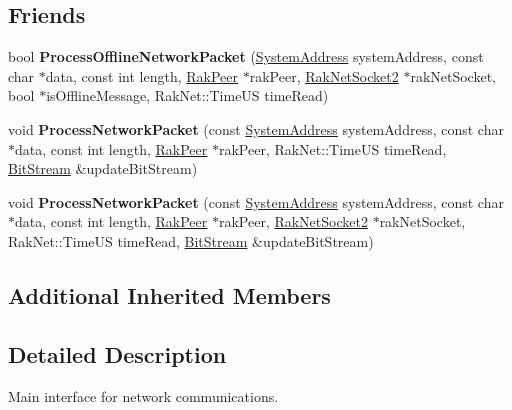 \subsection*{Friends}
\begin{DoxyCompactItemize}
\item 
\hypertarget{class_rak_net_1_1_rak_peer_a3e466ba5f51c005cfd11c2d51c850cfc}{bool {\bfseries Process\-Offline\-Network\-Packet} (\hyperlink{struct_rak_net_1_1_system_address}{System\-Address} system\-Address, const char $\ast$data, const int length, \hyperlink{class_rak_net_1_1_rak_peer}{Rak\-Peer} $\ast$rak\-Peer, \hyperlink{class_rak_net_1_1_rak_net_socket2}{Rak\-Net\-Socket2} $\ast$rak\-Net\-Socket, bool $\ast$is\-Offline\-Message, Rak\-Net\-::\-Time\-U\-S time\-Read)}\label{class_rak_net_1_1_rak_peer_a3e466ba5f51c005cfd11c2d51c850cfc}

\item 
\hypertarget{class_rak_net_1_1_rak_peer_a4fabf847d6bd9df927c3d901acf191de}{void {\bfseries Process\-Network\-Packet} (const \hyperlink{struct_rak_net_1_1_system_address}{System\-Address} system\-Address, const char $\ast$data, const int length, \hyperlink{class_rak_net_1_1_rak_peer}{Rak\-Peer} $\ast$rak\-Peer, Rak\-Net\-::\-Time\-U\-S time\-Read, \hyperlink{class_rak_net_1_1_bit_stream}{Bit\-Stream} \&update\-Bit\-Stream)}\label{class_rak_net_1_1_rak_peer_a4fabf847d6bd9df927c3d901acf191de}

\item 
\hypertarget{class_rak_net_1_1_rak_peer_a8ea495739778e3541a1f6347e72c09a7}{void {\bfseries Process\-Network\-Packet} (const \hyperlink{struct_rak_net_1_1_system_address}{System\-Address} system\-Address, const char $\ast$data, const int length, \hyperlink{class_rak_net_1_1_rak_peer}{Rak\-Peer} $\ast$rak\-Peer, \hyperlink{class_rak_net_1_1_rak_net_socket2}{Rak\-Net\-Socket2} $\ast$rak\-Net\-Socket, Rak\-Net\-::\-Time\-U\-S time\-Read, \hyperlink{class_rak_net_1_1_bit_stream}{Bit\-Stream} \&update\-Bit\-Stream)}\label{class_rak_net_1_1_rak_peer_a8ea495739778e3541a1f6347e72c09a7}

\end{DoxyCompactItemize}
\subsection*{Additional Inherited Members}


\subsection{Detailed Description}
Main interface for network communications. 

